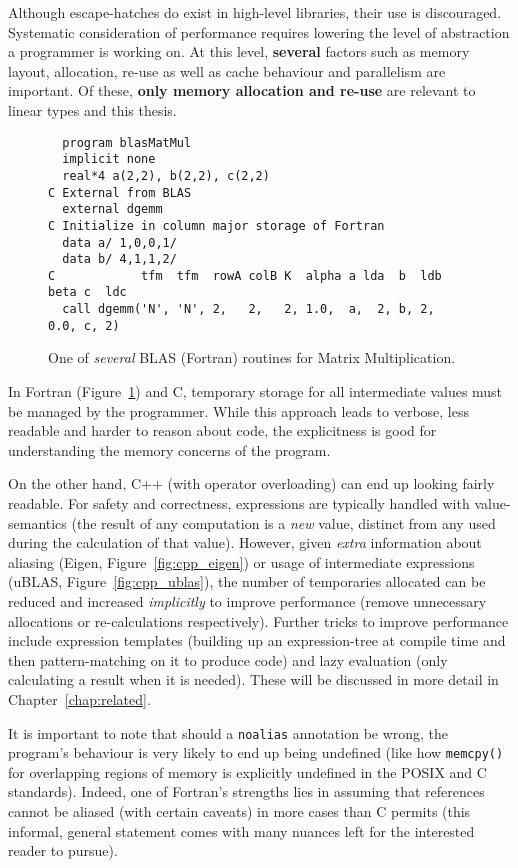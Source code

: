 Although escape-hatches do exist in high-level libraries, their use is
discouraged. Systematic consideration of performance requires lowering the
level of abstraction a programmer is working on. At this level, \textbf{several}
factors such as memory layout, allocation, re-use as well as cache behaviour
and parallelism are important. Of these, \textbf{only memory allocation and
re-use} are relevant to linear types and this thesis.

\begin{figure}[tbp]
    \begin{verbatim}
  program blasMatMul
  implicit none
  real*4 a(2,2), b(2,2), c(2,2)
C External from BLAS
  external dgemm
C Initialize in column major storage of Fortran
  data a/ 1,0,0,1/
  data b/ 4,1,1,2/
C            tfm  tfm  rowA colB K  alpha a lda  b  ldb beta c  ldc
  call dgemm('N', 'N', 2,   2,   2, 1.0,  a,  2, b, 2,  0.0, c, 2)
    \end{verbatim}
    \caption{One of \emph{several} BLAS (Fortran) routines for Matrix
    Multiplication.}\label{fig:fortran_blas}
\end{figure}

In Fortran (Figure~\ref{fig:fortran_blas}) and C, temporary storage for all
intermediate values must be managed by the programmer. While this approach
leads to verbose, less readable and harder to reason about code, the
explicitness is good for understanding the memory concerns of the program.

On the other hand, C++ (with operator overloading) can end up looking fairly
readable. For safety and correctness, expressions are typically handled with
value-semantics (the result of any computation is a \emph{new} value, distinct
from any used during the calculation of that value). However, given
\emph{extra} information about aliasing (Eigen, Figure~\ref{fig:cpp_eigen}) or
usage of intermediate expressions (uBLAS, Figure~\ref{fig:cpp_ublas}), the
number of temporaries allocated can be reduced and increased \emph{implicitly}
to improve performance (remove unnecessary allocations or re-calculations
respectively). Further tricks to improve performance include expression
templates (building up an expression-tree at compile time and then
pattern-matching on it to produce code) and lazy evaluation (only calculating a
result when it is needed). These will be discussed in more detail in
Chapter~\ref{chap:related}.

It is important to note that should a \texttt{noalias} annotation be wrong, the
program's behaviour is very likely to end up being undefined (like how
\texttt{memcpy()} for overlapping regions of memory is explicitly undefined in
the POSIX and C standards). Indeed, one of Fortran's strengths lies in assuming
that references cannot be aliased (with certain caveats) in more cases than C
permits (this informal, general statement comes with many nuances left for the
interested reader to pursue).

